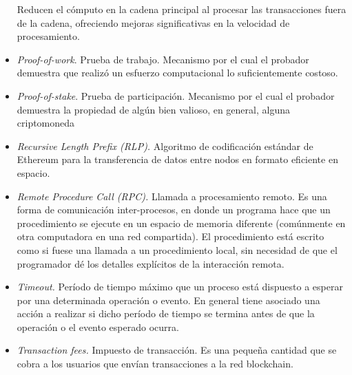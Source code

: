 \begin{itemize}
     Reducen el cómputo en la cadena principal al procesar las transacciones fuera de la cadena, ofreciendo mejoras
     significativas en la velocidad de procesamiento.
     \item \textit{Proof-of-work}. Prueba de trabajo. Mecanismo por el cual el probador demuestra que
     realizó un esfuerzo computacional lo suficientemente costoso.
     \item \textit{Proof-of-stake}. Prueba de participación. Mecanismo por el cual el probador demuestra la propiedad de
     algún bien valioso, en general, alguna criptomoneda
     \item \textit{Recursive Length Prefix (RLP).} Algoritmo de codificación estándar de Ethereum para la transferencia de datos
     entre nodos en formato eficiente en espacio.
     \item \textit{Remote Procedure Call (RPC).} Llamada a procesamiento remoto. Es una forma de comunicación inter-procesos,
     en donde un programa hace que un procedimiento se ejecute en un espacio de memoria diferente (comúnmente en otra computadora
     en una red compartida). El procedimiento  está escrito como si fuese una llamada a un procedimiento local, sin necesidad de
     que el programador dé los detalles explícitos de la interacción remota.
     \item \textit{Timeout.} Período de tiempo máximo que un proceso está dispuesto a esperar por una determinada
     operación o evento. En general tiene asociado una acción a realizar si dicho período de tiempo se termina antes
     de que la operación o el evento esperado ocurra.
     \item \textit{Transaction fees.} Impuesto de transacción. Es una pequeña cantidad que se cobra a los
     usuarios que envían transacciones a la red blockchain.  
\end{itemize}